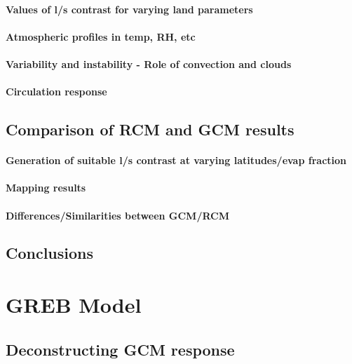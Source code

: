 \paragraph{Values of l/s contrast for varying land parameters}
\paragraph{Atmospheric profiles in temp, RH, etc}
\paragraph{Variability and instability - Role of convection and clouds}
\paragraph{Circulation response}


\subsection{Comparison of RCM and GCM results}

\paragraph{Generation of suitable l/s contrast at varying latitudes/evap fraction}
\paragraph{Mapping results}
\paragraph{Differences/Similarities between GCM/RCM}


\subsection{Conclusions}


\section{GREB Model}

\subsection{Deconstructing GCM response}

